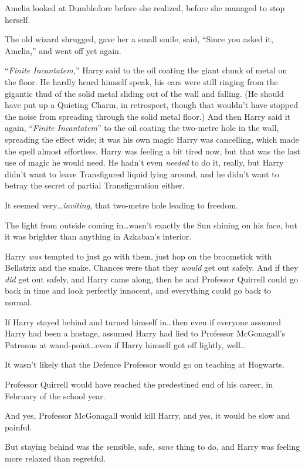 Amelia looked at Dumbledore before she realized, before she managed to stop herself.

The old wizard shrugged, gave her a small smile, said, “Since you asked it, Amelia,” and went off yet again.

\later

“\emph{Finite Incantatem,}” Harry said to the oil coating the giant chunk of metal on the floor. He hardly heard himself speak, his ears were still ringing from the gigantic thud of the solid metal sliding out of the wall and falling. (He should have put up a Quieting Charm, in retrospect, though that wouldn’t have stopped the noise from spreading through the solid metal floor.) And then Harry said it again, “\emph{Finite Incantatem}” to the oil coating the two-metre hole in the wall, spreading the effect wide; it was his own magic Harry was cancelling, which made the spell almost effortless. Harry was feeling a bit tired now, but that was the last use of magic he would need. He hadn’t even \emph{needed} to do it, really, but Harry didn’t want to leave Transfigured liquid lying around, and he didn’t want to betray the secret of partial Transfiguration either.

It seemed very…\emph{inviting,} that two-metre hole leading to freedom.

The light from outside coming in…wasn’t exactly the Sun shining on his face, but it was brighter than anything in Azkaban’s interior.

Harry \emph{was} tempted to just go with them, just hop on the broomstick with Bellatrix and the snake. Chances were that they \emph{would} get out safely. And if they \emph{did} get out safely, and Harry came along, then he and Professor Quirrell could go back in time and look perfectly innocent, and everything could go back to normal.

If Harry stayed behind and turned himself in…then even if everyone assumed Harry had been a hostage, assumed Harry had lied to Professor McGonagall’s Patronus at wand-point…even if Harry himself got off lightly, well…

It wasn’t likely that the Defence Professor would go on teaching at Hogwarts.

Professor Quirrell would have reached the predestined end of his career, in February of the school year.

And yes, Professor McGonagall would kill Harry, and yes, it would be slow and painful.

But staying behind was the sensible, safe, \emph{sane} thing to do, and Harry was feeling more relaxed than regretful.

